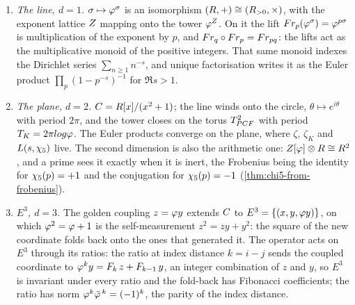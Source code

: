\begin{theorem}\label{thm:one-two-three}
\begin{enumerate}[label=\textup{(\arabic*)}]
  \item \emph{The line, $d=1$.}  $\sigma\mapsto\varphi^\sigma$ is an isomorphism
    $(R,+)\cong(R_{>0},\times)$, with the exponent lattice $Z$ mapping onto the tower
    $\varphi^{Z}$.  On it the lift $Fr_p(\varphi^\sigma)=\varphi^{p\sigma}$ is
    multiplication of the exponent by $p$, and $Fr_q\circ Fr_p=Fr_{pq}$: the lifts
    act as the multiplicative monoid of the positive integers.  That same monoid indexes
    the Dirichlet series $\sum_{n\ge1}n^{-s}$, and unique factorisation writes it as the
    Euler product $\prod_p(1-p^{-s})^{-1}$ for $\Re s>1$.
  \item \emph{The plane, $d=2$.}  $C=R[x]/(x^2+1)$; the line winds onto the circle,
    $\theta\mapsto e^{i\theta}$ with period $2\pi$, and the tower closes on the torus
    $T^2_{PCF}$ with period $T_K=2\pi log\varphi$.  The Euler products converge on the
    plane, where $\zeta$, $\zeta_K$ and $L(s,\chi_5)$ live.  The second dimension is
    also the arithmetic one: $Z[\varphi]\otimes R\cong R^2$, and a prime sees it exactly when
    it is inert, the Frobenius being the identity for $\chi_5(p)=+1$ and the
    conjugation for $\chi_5(p)=-1$ (\cref{thm:chi5-from-frobenius}).
  \item \emph{$E^3$, $d=3$.}  The golden coupling $z=\varphi y$ extends $C$ to
    $E^3=\{(x,y,\varphi y)\}$, on which $\varphi^2=\varphi+1$ is the self-measurement
    $z^2=zy+y^2$: the square of the new coordinate folds back onto the ones that
    generated it.  The operator acts on $E^3$ through its ratios: the ratio at index
    distance $k=i-j$ sends the coupled coordinate to
    $\varphi^{k}y=F_{k}\,z+F_{k-1}\,y$, an integer combination of $z$ and $y$, so
    $E^3$ is invariant under every ratio and the fold-back has Fibonacci
    coefficients; the ratio has norm $\varphi^k\bar{\varphi}^{\,k}=(-1)^k$, the parity of
    the index distance.
\end{enumerate}
%
\end{theorem}

